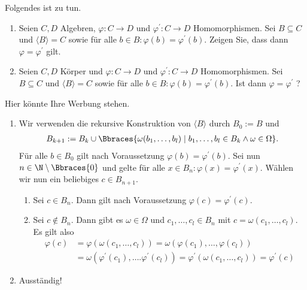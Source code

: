 \begin{exercise}
    Folgendes ist zu tun.
    \begin{enumerate}[label = (\roman*)]
        \item Seien $C,D$ Algebren, $\varphi:C \to D$ und $\varphi^\prime:C \to D$ Homomorphismen. Sei $B \subseteq C$ und $\langle B \rangle = C$ sowie für alle $b \in B: \varphi(b) = \varphi^\prime(b)$. Zeigen Sie, dass dann $\varphi = \varphi^\prime$ gilt.
        
        \item Seien $C,D$ Körper und  $\varphi:C \to D$ und $\varphi^\prime:C \to D$ Homomorphismen. Sei $B \subseteq C$ und $\langle B \rangle = C$ sowie für alle $b \in B: \varphi(b) = \varphi^\prime(b)$. Ist dann $\varphi = \varphi^\prime$ ?
    \end{enumerate}
\end{exercise}

\begin{solution}
    Hier könnte Ihre Werbung stehen.
    \begin{enumerate}[label = (\roman*)]
        \item Wir verwenden die rekursive Konstruktion von $\langle B \rangle$ durch $B_0 := B$ und
        \begin{align*}
            B_{k + 1} := B_k \cup \Bbraces{\omega(b_1, \dots, b_l) \mid b_1, \dots, b_l \in B_k \land \omega \in \Omega}.
        \end{align*}
        Für alle $b \in B_0$ gilt nach Voraussetzung $\varphi(b) = \varphi^\prime(b)$. Sei nun $n \in \N \setminus \Bbraces{0}$ und gelte für alle $x \in B_n: \varphi(x) = \varphi^\prime(x)$. Wählen wir nun ein beliebiges $c \in B_{n + 1}$. 
        \begin{enumerate}[label = Fall \arabic*:]
            \item Sei $c \in B_n$. Dann gilt nach Voraussetzung $\varphi(c) = \varphi^\prime(c)$. 
            \item Sei $c \notin B_n$. Dann gibt es $\omega \in \Omega$ und $c_1, \dots, c_l \in B_n$ mit $c = \omega(c_1, \dots, c_l)$. Es gilt also
            \begin{align*}
                \varphi(c) &= \varphi(\omega(c_1, \dots, c_l)) = \omega(\varphi(c_1), \dots, \varphi(c_l)) \\
                &= \omega(\varphi^\prime(c_1), \dots. \varphi^\prime(c_l)) = \varphi^\prime(\omega(c_1, \dots, c_l)) = \varphi^\prime(c)
            \end{align*}
        \end{enumerate}
        \item Ausständig!
    \end{enumerate}
\end{solution}